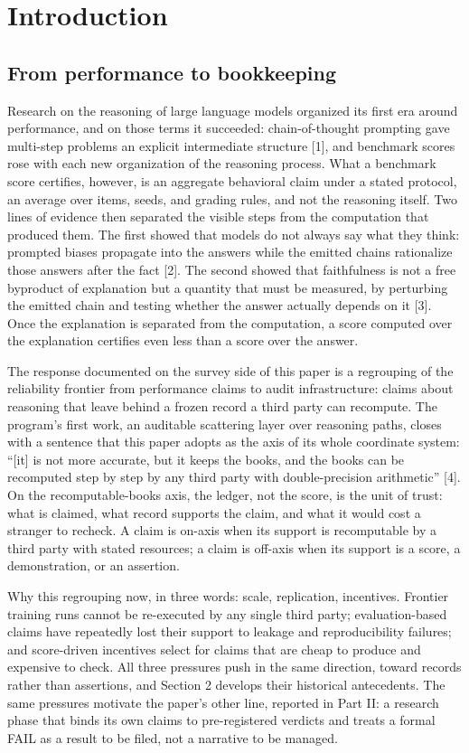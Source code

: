 \documentclass[11pt]{article}
\begin{document}
\section{Introduction}
\label{sec:1}
\subsection{From performance to bookkeeping}
\noindent Research on the reasoning of large language models organized its first era around performance, and on those terms it succeeded: chain-of-thought prompting gave multi-step problems an explicit intermediate structure [1], and benchmark scores rose with each new organization of the reasoning process. What a benchmark score certifies, however, is an aggregate behavioral claim under a stated protocol, an average over items, seeds, and grading rules, and not the reasoning itself. Two lines of evidence then separated the visible steps from the computation that produced them. The first showed that models do not always say what they think: prompted biases propagate into the answers while the emitted chains rationalize those answers after the fact [2]. The second showed that faithfulness is not a free byproduct of explanation but a quantity that must be measured, by perturbing the emitted chain and testing whether the answer actually depends on it [3]. Once the explanation is separated from the computation, a score computed over the explanation certifies even less than a score over the answer.\par
\noindent The response documented on the survey side of this paper is a regrouping of the reliability frontier from performance claims to audit infrastructure: claims about reasoning that leave behind a frozen record a third party can recompute. The program's first work, an auditable scattering layer over reasoning paths, closes with a sentence that this paper adopts as the axis of its whole coordinate system: ``[it] is not more accurate, but it keeps the books, and the books can be recomputed step by step by any third party with double-precision arithmetic'' [4]. On the recomputable-books axis, the ledger, not the score, is the unit of trust: what is claimed, what record supports the claim, and what it would cost a stranger to recheck. A claim is on-axis when its support is recomputable by a third party with stated resources; a claim is off-axis when its support is a score, a demonstration, or an assertion.\par
\noindent Why this regrouping now, in three words: scale, replication, incentives. Frontier training runs cannot be re-executed by any single third party; evaluation-based claims have repeatedly lost their support to leakage and reproducibility failures; and score-driven incentives select for claims that are cheap to produce and expensive to check. All three pressures push in the same direction, toward records rather than assertions, and Section 2 develops their historical antecedents. The same pressures motivate the paper's other line, reported in Part II: a research phase that binds its own claims to pre-registered verdicts and treats a formal FAIL as a result to be filed, not a narrative to be managed.\par
\end{document}

